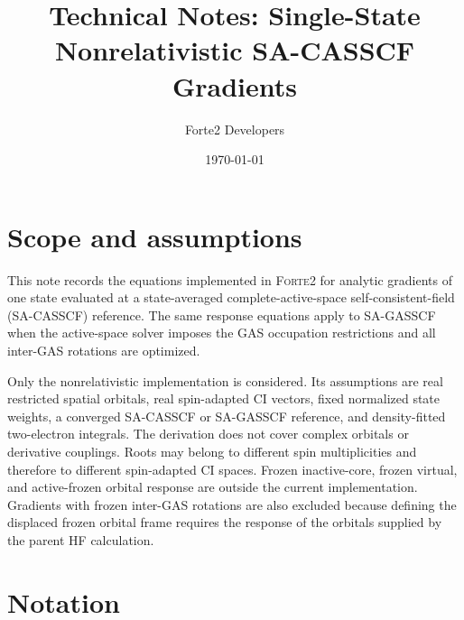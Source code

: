 \documentclass[aip,preprint,nofootinbib]{revtex4-1}
\newcommand{\forte}{\textsc{Forte2}\xspace}
\begin{document}
\title{Technical Notes: Single-State Nonrelativistic SA-CASSCF Gradients}

\author{Forte2 Developers}

\date{\today}

\maketitle

\section{Scope and assumptions}

This note records the equations implemented in \forte for analytic gradients
of one state evaluated at a state-averaged complete-active-space
self-consistent-field (SA-CASSCF) reference.  The same response equations
apply to SA-GASSCF when the active-space solver imposes the GAS occupation
restrictions and all inter-GAS rotations are optimized.

Only the nonrelativistic implementation is considered.  Its assumptions are
real restricted spatial orbitals, real spin-adapted CI vectors, fixed normalized
state weights, a converged SA-CASSCF or SA-GASSCF reference, and
density-fitted two-electron integrals.  The derivation does not cover complex
orbitals or derivative couplings.  Roots may belong to different spin
multiplicities and therefore to different spin-adapted CI spaces.  Frozen
inactive-core, frozen virtual, and active-frozen orbital response are outside
the current implementation.  Gradients with frozen inter-GAS rotations are
also excluded because defining the displaced frozen orbital frame requires
the response of the orbitals supplied by the parent HF calculation.

\section{Notation}
\end{document}
